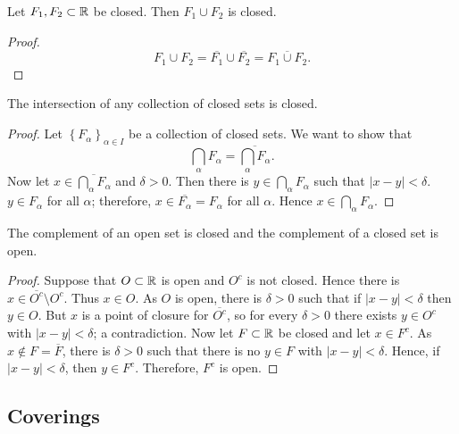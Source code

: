 \begin{proposition}[]
	Let $F_1, F_2 \subset \mathbb{R}$ be closed.
	Then $F_1 \cup F_2$ is closed.
\end{proposition}

\begin{proof}
	\[
		F_1 \cup F_2 
		= \overline{F_1} \cup \overline{F_2}
		= \overline{F_1 \cup F_2}.
	\]
\end{proof}

\begin{proposition}[]
	The intersection of any collection of closed sets is closed.
\end{proposition}

\begin{proof}
	Let $\left\{ F_{\alpha} \right\}_{\alpha \in I}$ be a collection of closed
	sets.
	We want to show that
	\[
		\bigcap_{\alpha} F_{\alpha} = \overline{\bigcap_{\alpha} F_\alpha}.
	\]
	Now let $x \in \overline{\bigcap_{\alpha} F_\alpha}$ and $\delta > 0$.
	Then there is $y \in \bigcap_{\alpha} F_\alpha$ such that
	$\left\lvert x - y \right\rvert < \delta$.
	$y \in F_\alpha$ for all $\alpha$; therefore, 
	$x \in \overline{F_\alpha} = F_\alpha$ for all $\alpha$.
	Hence $x \in \bigcap_{\alpha} F_\alpha$.
\end{proof}

\begin{proposition}[]
	The complement of an open set is closed and the complement of a closed set
	is open.
\end{proposition}

\begin{proof}
	Suppose that $O \subset \mathbb{R}$ is open and $O^c$ is not closed.
	Hence there is $x \in \overline{O^c} \setminus O^c$.
	Thus $x \in O$.
	As $O$ is open, there is $\delta > 0$ such that if
	$\left\lvert x - y \right\rvert < \delta$ then $y \in O$.
	But $x$ is a point of closure for $\overline{O^c}$, so for every $\delta > 0$
	there exists $y \in O^c$ with $\left\lvert x - y \right\rvert < \delta$;
	a contradiction.
	Now let $F \subset \mathbb{R}$ be closed and let $x \in F^c$.
	As $x \not\in F = \overline F$, there is $\delta > 0$ such that there is no
	$y \in F$ with $\left\lvert x - y \right\rvert < \delta$.
	Hence, if $\left\lvert x - y \right\rvert < \delta$, then $y \in F^c$.
	Therefore, $F^c$ is open.
\end{proof}

\subsection{Coverings}

